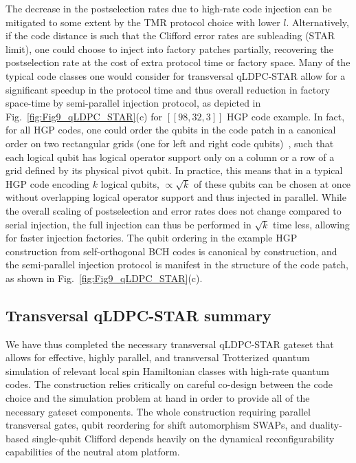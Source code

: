 \documentclass[aps, prx, reprint, superscriptaddress, longbibliography, floatfix]{revtex4-2}
\begin{document}
The decrease in the postselection rates due to high-rate code injection can be mitigated to some extent by the TMR protocol choice with lower $l$. Alternatively, if the code distance is such that the Clifford error rates are subleading (STAR limit), one could choose to inject into factory patches partially, recovering the postselection rate at the cost of extra protocol time or factory space. Many of the typical code classes one would consider for transversal qLDPC-STAR allow for a significant speedup in the protocol time and thus overall reduction in factory space-time by semi-parallel injection protocol, as depicted in  Fig.~\ref{fig:Fig9_qLDPC_STAR}(c) for $[[98,32,3]]$ HGP code example. In fact, for all HGP codes, one could order the qubits in the code patch in a canonical order on two rectangular grids (one for left and right code qubits)~\cite{Quintavalle2023}, such that each logical qubit has logical operator support only on a column or a row of a grid defined by its physical pivot qubit. In practice, this means that in a typical HGP code encoding $k$ logical qubits, $\propto \sqrt{k}$ of these qubits can be chosen at once without overlapping logical operator support and thus injected in parallel. While the overall scaling of postselection and error rates does not change compared to serial injection, the full injection can thus be performed in $\sqrt{k}$ time less, allowing for faster injection factories. The qubit ordering in the example HGP construction from self-orthogonal BCH codes is canonical by construction, and the semi-parallel injection protocol is manifest in the structure of the code patch, as shown in Fig.~\ref{fig:Fig9_qLDPC_STAR}(c).


\subsection{Transversal qLDPC-STAR summary}
\label{sec:qLDPC_summary}

We have thus completed the necessary transversal qLDPC-STAR gateset that allows for effective, highly parallel, and transversal Trotterized quantum simulation of relevant local spin Hamiltonian classes with high-rate quantum codes. The construction relies critically on careful co-design between the code choice and the simulation problem at hand in order to provide all of the necessary gateset components. The whole construction requiring parallel transversal gates, qubit reordering for shift automorphism SWAPs, and duality-based single-qubit Clifford depends heavily on the dynamical reconfigurability capabilities of the neutral atom platform. 
\end{document}
